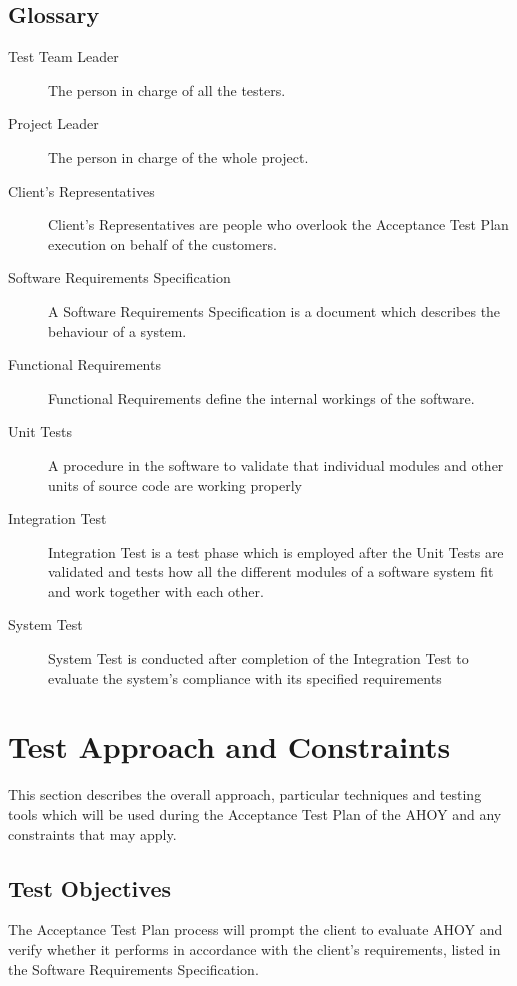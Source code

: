 \documentclass[titlepage]{article}
\begin{document}
\subsection{Glossary%
    \label{glossary}%
}
    \begin{description}
        \item[Test Team Leader]
            The person in charge of all the testers.
        \item[Project Leader]
            The person in charge of the whole project.
        \item[Client's Representatives]
            Client's Representatives are people who overlook the Acceptance Test Plan execution on behalf of the customers.
        \item[Software Requirements Specification]
            A Software Requirements Specification is a document which describes the behaviour of a system.
        \item[Functional Requirements]
            Functional Requirements define the internal workings of the software.
        \item[Unit Tests]
            A procedure in the software to validate that individual modules and other units of source code are working properly
        \item[Integration Test]
            Integration Test is a test phase which is employed after the Unit Tests are validated and tests how all the different modules of a software system fit and work together with each other.
        \item[System Test]
            System Test is conducted after completion of the Integration Test to evaluate the system's compliance with its specified requirements
    \end{description}


\section{Test Approach and Constraints%
    \label{approach}%
}
    This section describes the overall approach, particular techniques and testing tools which will be used during the Acceptance Test Plan of the AHOY and any constraints that may apply.


\subsection{Test Objectives%
    \label{objectives}%
}
    The Acceptance Test Plan process will prompt the client to evaluate AHOY and verify whether it performs in accordance with the client's requirements, listed in the Software Requirements Specification.
\end{document}
